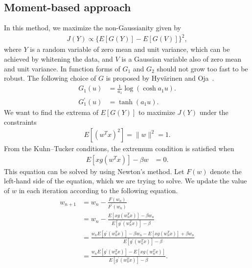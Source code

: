 \documentclass[aps,prl,preprint,superscriptaddress]{revtex4-2}
\begin{document}
\subsection{Moment-based approach}
In this method, we maximize the non-Gaussianity given by
\begin{align}
J(Y) \propto \{E[G(Y)] - E[G(V)]\}^2,
\end{align}
where $Y$ is a random variable of zero mean and unit variance, which can be achieved by whitening the data, and $V$ is a Gaussian variable also of zero mean and unit variance. In function forms of $G_1$ and $G_2$ should not grow too fast to be robust. The following choice of $G$ is proposed by Hyvärinen and Oja~\cite{hyvarinen2000independent}.
\begin{align}
G_1(u) &= \frac{1}{a_1} \log (\cosh a_1 u). \\
G_1^{\prime}(u) &= \tanh(a_1 u).
\end{align}
We want to find the extrema of $E[G(Y)]$ to maximize $J(Y)$ under the constraints
\begin{align}
E[(w^T x)^2] = \| w\|^2 = 1.
\end{align}
From the Kuhn--Tucker conditions, the extremum condition is satisfied when
\begin{align}
E[x g(w^Tx)] - \beta w &= 0.
\end{align}
This equation can be solved by using Newton's method.
Let $F(w)$ denote the left-hand side of the equation, which we are trying to solve.
We update the value of $w$ in each iteration according to the following equation.
\begin{align}
w_{n+1} &= w_n - \frac{F(w_n)}{F^{\prime}(w_n)} \\
&= w_n - \frac{E[x g (w_n^T x)] - \beta w_n}{E[g^{\prime}(w_n^T x)] - \beta} \\
&= \frac{w_n E[g^{\prime}(w_n^T x)] - \beta w_n - E[x g (w_n^T x)] + \beta w_n}{E[g^{\prime}(w_n^T x)] - \beta} \\
&= \frac{w_n E[g^{\prime}(w_n^T x)] - E[x g (w_n^T x)]}{E[g^{\prime}(w_n^T x)] - \beta}.
\end{align}
\end{document}
